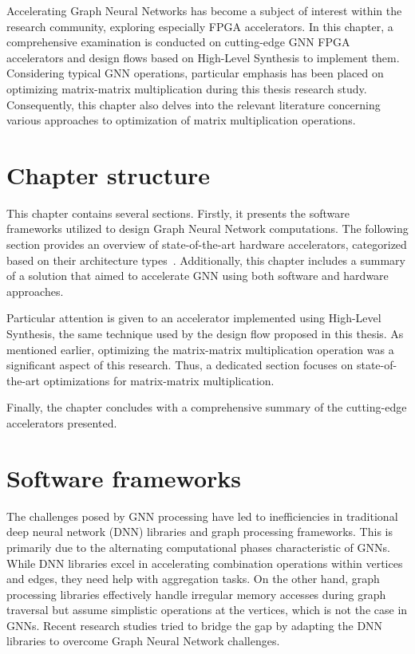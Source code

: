 Accelerating Graph Neural Networks has become a subject of interest within the research community, exploring especially FPGA accelerators.
In this chapter, a comprehensive examination is conducted on cutting-edge GNN FPGA accelerators and design flows based on High-Level Synthesis to implement them.
Considering typical GNN operations, particular emphasis has been placed on optimizing matrix-matrix multiplication during this thesis research study.
Consequently, this chapter also delves into the relevant literature concerning various approaches to optimization of matrix multiplication operations.

\section{Chapter structure}
\label{sec:related_work_structure}%
This chapter contains several sections.
Firstly, it presents the software frameworks utilized to design Graph Neural Network computations.
The following section provides an overview of state-of-the-art hardware accelerators, categorized based on their architecture types~\cite{DBLP:journals/corr/abs-2010-00130}.
Additionally, this chapter includes a summary of a solution that aimed to accelerate GNN using both software and hardware approaches.

Particular attention is given to an accelerator implemented using High-Level Synthesis, the same technique used by the design flow proposed in this thesis.
As mentioned earlier, optimizing the matrix-matrix multiplication operation was a significant aspect of this research.
Thus, a dedicated section focuses on state-of-the-art optimizations for matrix-matrix multiplication.

Finally, the chapter concludes with a comprehensive summary of the cutting-edge accelerators presented.

\section{Software frameworks}
\label{sec:related_work_software_frameworks}%

The challenges posed by GNN processing have led to inefficiencies in traditional deep neural network (DNN) libraries and graph processing frameworks.
This is primarily due to the alternating computational phases characteristic of GNNs.
While DNN libraries excel in accelerating combination operations within vertices and edges, they need help with aggregation tasks.
On the other hand, graph processing libraries effectively handle irregular memory accesses during graph traversal but assume simplistic operations at the vertices, which is not the case in GNNs. Recent research studies tried to bridge the gap by adapting the DNN libraries to overcome Graph Neural Network challenges.


